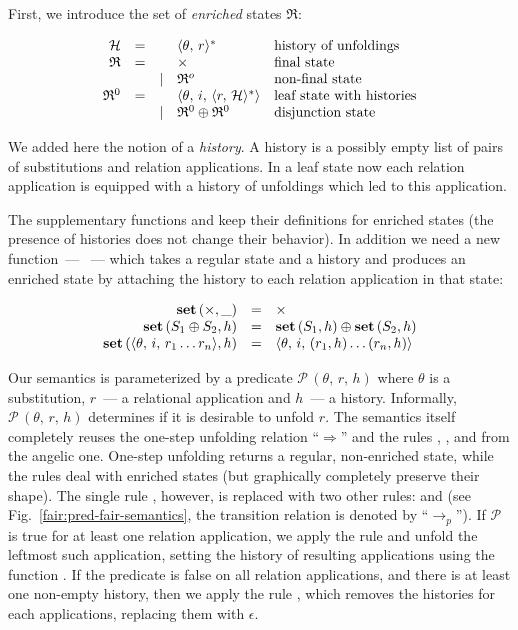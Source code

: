 First, we introduce the set of \emph{enriched} states $\mathfrak{R}$:

\[
\begin{array}{rccll}
  \mathcal{H}    & = &      & \langle \theta,\,r \rangle^* & \mbox{history of unfoldings}\\
  \mathfrak{R}   & = &      & \times & \mbox{final state}\\
                 &   & \mid & \mathfrak{R}^o & \mbox{non-final state}\\
  \mathfrak{R}^0 & = &      & \langle \theta,\, i,\, \langle r,\, \mathcal{H} \rangle^* \rangle & \mbox{leaf state with histories}\\
                 &   & \mid & \mathfrak{R}^0 \oplus \mathfrak{R}^0 & \mbox{disjunction state}
\end{array}
\]

We added here the notion of a \emph{history}. A history is a possibly empty list of pairs of substitutions and relation applications. In a leaf state now each
relation application is equipped with a history of unfoldings which led to this application.

The supplementary functions  and  keep their definitions for enriched states (the presence of histories does not change their behavior).
In addition we need a new function~--- ~--- which takes a regular state and a history and produces an enriched state by attaching the
history to each relation application in that state:

\[
\begin{array}{rcl}
    \mbox{\bf set}\,(\times, \_) & = & \times \\
    \mbox{\bf set}\,(S_1 \oplus S_2, h) & = & \mbox{\bf set}\,(S_1, h) \oplus \mbox{\bf set}\,(S_2, h) \\
    \mbox{\bf set}\,(\langle \theta,\, i,\, r_1\ldots r_n \rangle, h) & = & \langle \theta,\, i,\, (r_1, h) \ldots (r_n, h) \rangle 
\end{array}
\]

Our semantics is parameterized by a predicate $\mathcal{P}\,(\theta,\,r,\,h)$ where $\theta$ is a substitution, $r$~--- a relational application and $h$~--- a history. Informally,
$\mathcal{P}\,(\theta,\,r,\,h)$ determines if it is desirable to unfold $r$. The semantics itself completely reuses the one-step unfolding relation ``$\Rightarrow$'' and the
rules , , and  from the angelic one. One-step unfolding returns a regular, non-enriched state, while the rules deal with enriched
states (but graphically completely preserve their shape). The single rule , however, is replaced with two other rules:  and 
(see Fig.~\ref{fair:pred-fair-semantics}, the transition relation is denoted by ``$\rightarrow_p$''). If $\mathcal{P}$ is true for at least one relation application, we apply the
rule  and unfold the leftmost such application, setting the history of resulting applications using the function . If the predicate is false on all
relation applications, and there is at least one non-empty history, then we apply the rule , which removes the histories for each applications, replacing
them with $\epsilon$. 

